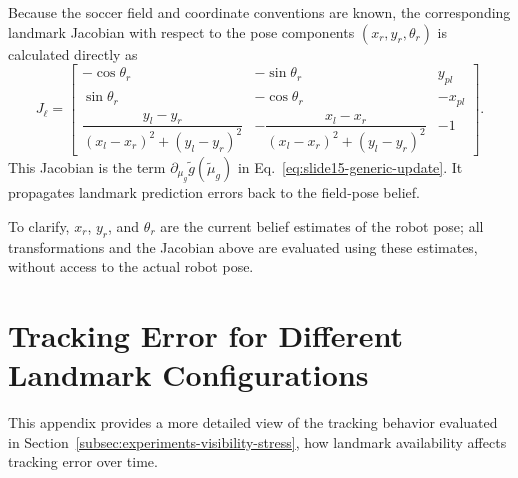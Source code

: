 Because the soccer field and coordinate conventions are known, the corresponding landmark Jacobian with respect to the pose components $(x_r,y_r,\theta_r)$ is calculated directly as
\begin{equation}
    J_\ell
    =
    \begin{bmatrix}
        -\cos\theta_r & -\sin\theta_r & y_{pl} \\
        \sin\theta_r & -\cos\theta_r & -x_{pl} \\
        \dfrac{y_l-y_r}{(x_l-x_r)^2+(y_l-y_r)^2}
        &
        -\dfrac{x_l-x_r}{(x_l-x_r)^2+(y_l-y_r)^2}
        &
        -1
    \end{bmatrix}.
    \label{eq:landmark-jacobian}
\end{equation}
This Jacobian is the term $\partial_{\mu_g}\tilde{g}(\tilde{\mu}_g)$ in Eq.~\ref{eq:slide15-generic-update}. It propagates landmark prediction errors back to the field-pose belief.

To clarify, $x_r$, $y_r$, and $\theta_r$ are the current belief
estimates of the robot pose; all transformations and the Jacobian
above are evaluated using these estimates, without access to the
actual robot pose.

\FloatBarrier

\section{Tracking Error for Different Landmark Configurations}
\label{sec:appendix-landmark-tracking}

This appendix provides a more detailed view of the tracking behavior evaluated in Section~\ref{subsec:experiments-visibility-stress}, how landmark availability affects tracking
error over time. 


